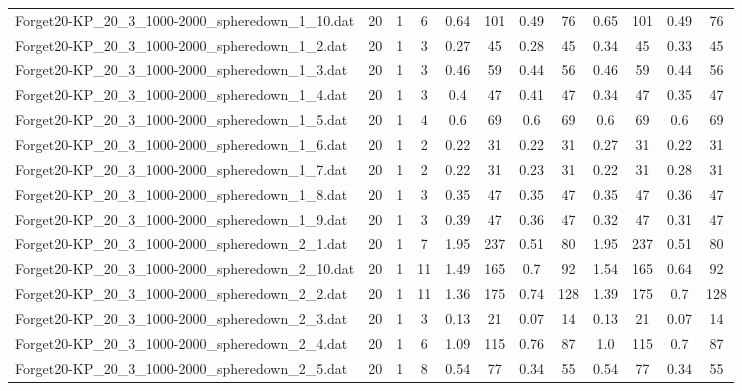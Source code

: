\begin{sidewaystable}[!ht]
{\begin{tabular}{lccccccccccc}
Forget20-KP\_20\_3\_1000-2000\_spheredown\_1\_10.dat & 20 & 1 & 6 & 0.64 & 101 &  \textcolor{blue2}{0.49} & 76 & 0.65 & 101 &  \textcolor{blue2}{0.49} & 76 \\
Forget20-KP\_20\_3\_1000-2000\_spheredown\_1\_2.dat & 20 & 1 & 3 &  \textcolor{blue2}{0.27} & 45 & 0.28 & 45 & 0.34 & 45 & 0.33 & 45 \\
Forget20-KP\_20\_3\_1000-2000\_spheredown\_1\_3.dat & 20 & 1 & 3 & 0.46 & 59 & 0.44 & 56 & 0.46 & 59 & 0.44 & 56 \\
Forget20-KP\_20\_3\_1000-2000\_spheredown\_1\_4.dat & 20 & 1 & 3 & 0.4 & 47 & 0.41 & 47 &  \textcolor{blue2}{0.34} & 47 & 0.35 & 47 \\
Forget20-KP\_20\_3\_1000-2000\_spheredown\_1\_5.dat & 20 & 1 & 4 & 0.6 & 69 & 0.6 & 69 & 0.6 & 69 & 0.6 & 69 \\
Forget20-KP\_20\_3\_1000-2000\_spheredown\_1\_6.dat & 20 & 1 & 2 &  \textcolor{blue2}{0.22} & 31 &  \textcolor{blue2}{0.22} & 31 & 0.27 & 31 &  \textcolor{blue2}{0.22} & 31 \\
Forget20-KP\_20\_3\_1000-2000\_spheredown\_1\_7.dat & 20 & 1 & 2 &  \textcolor{blue2}{0.22} & 31 & 0.23 & 31 &  \textcolor{blue2}{0.22} & 31 & 0.28 & 31 \\
Forget20-KP\_20\_3\_1000-2000\_spheredown\_1\_8.dat & 20 & 1 & 3 &  \textcolor{blue2}{0.35} & 47 &  \textcolor{blue2}{0.35} & 47 &  \textcolor{blue2}{0.35} & 47 & 0.36 & 47 \\
Forget20-KP\_20\_3\_1000-2000\_spheredown\_1\_9.dat & 20 & 1 & 3 & 0.39 & 47 & 0.36 & 47 & 0.32 & 47 &  \textcolor{blue2}{0.31} & 47 \\
Forget20-KP\_20\_3\_1000-2000\_spheredown\_2\_1.dat & 20 & 1 & 7 & 1.95 & 237 &  \textcolor{blue2}{0.51} & 80 & 1.95 & 237 &  \textcolor{blue2}{0.51} & 80 \\
Forget20-KP\_20\_3\_1000-2000\_spheredown\_2\_10.dat & 20 & 1 & 11 & 1.49 & 165 & 0.7 & 92 & 1.54 & 165 &  \textcolor{blue2}{0.64} & 92 \\
Forget20-KP\_20\_3\_1000-2000\_spheredown\_2\_2.dat & 20 & 1 & 11 & 1.36 & 175 & 0.74 & 128 & 1.39 & 175 & 0.7 & 128 \\
Forget20-KP\_20\_3\_1000-2000\_spheredown\_2\_3.dat & 20 & 1 & 3 & 0.13 & 21 &  \textcolor{blue2}{0.07} & 14 & 0.13 & 21 &  \textcolor{blue2}{0.07} & 14 \\
Forget20-KP\_20\_3\_1000-2000\_spheredown\_2\_4.dat & 20 & 1 & 6 & 1.09 & 115 & 0.76 & 87 & 1.0 & 115 &  \textcolor{blue2}{0.7} & 87 \\
Forget20-KP\_20\_3\_1000-2000\_spheredown\_2\_5.dat & 20 & 1 & 8 & 0.54 & 77 &  \textcolor{blue2}{0.34} & 55 & 0.54 & 77 &  \textcolor{blue2}{0.34} & 55 \\

\end{tabular}}
\end{sidewaystable}
